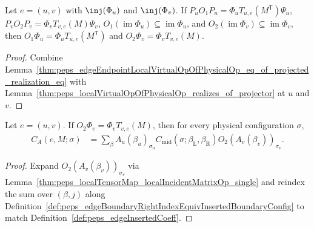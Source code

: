 \begin{lemma}%
    \label{thm:peps_edgePhysicalToVirtualInsertion_of_projected_realization_eq}
    \leanok
    Let $e=(u,v)$ with $\inj(\Phi_u)$ and $\inj(\Phi_v)$. If
    $P_uO_1P_u=\Phi_uT_{u,e}(M^{\mathsf T})\Psi_u$,
    $P_vO_2P_v=\Phi_vT_{v,e}(M)\Psi_v$, $O_1(\operatorname{im}\Phi_u)\subseteq\operatorname{im}\Phi_u$,
    and $O_2(\operatorname{im}\Phi_v)\subseteq\operatorname{im}\Phi_v$, then
    $O_1\Phi_u=\Phi_uT_{u,e}(M^{\mathsf T})$ and $O_2\Phi_v=\Phi_vT_{v,e}(M)$.
\end{lemma}
\begin{proof}\leanok
    Combine Lemma~\ref{thm:peps_edgeEndpointLocalVirtualOpOfPhysicalOp_eq_of_projected_realization_eq}
    with Lemma~\ref{thm:peps_localVirtualOpOfPhysicalOp_realizes_of_projector}
    at $u$ and $v$.
\end{proof}

\begin{lemma}%
    \label{thm:peps_edgeInsertedCoeff_rightPhysicalRealization}
    \leanok
    Let $e=(u,v)$. If $O_2\Phi_v=\Phi_vT_{v,e}(M)$, then for every physical
    configuration $\sigma$,
    \begin{align}
        C_A(e,M;\sigma)
         & =\sum_{\beta} A_u(\beta_u)_{\sigma_u}
        C_{\mathrm{mid}}(\sigma;\beta_{\mathrm{L}},\beta_{\mathrm{R}})
        O_2(A_v(\beta_v))_{\sigma_v}.
        \label{eq:peps_edgeInsertedCoeff_right_realization}
    \end{align}
\end{lemma}
\begin{proof}\leanok
    Expand $O_2(A_v(\beta_v))_{\sigma_v}$ via
    Lemma~\ref{thm:peps_localTensorMap_localIncidentMatrixOp_single} and
    reindex the sum over $(\beta,j)$ along
    Definition~\ref{def:peps_edgeBoundaryRightIndexEquivInsertedBoundaryConfig}
    to match Definition~\ref{def:peps_edgeInsertedCoeff}.
\end{proof}

